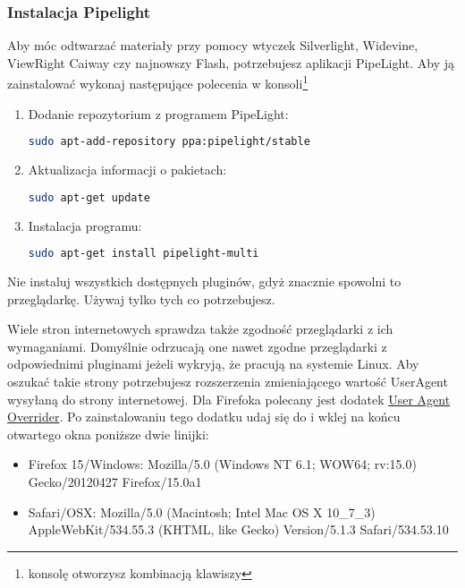 \subsubsection{Instalacja Pipelight}
Aby móc odtwarzać materiały przy pomocy wtyczek Silverlight, Widevine, ViewRight Caiway czy najnowszy Flash, potrzebujesz aplikacji PipeLight. Aby ją zainstalować wykonaj następujące polecenia w konsoli\footnote{konsolę otworzysz kombinacją klawiszy }
\begin{enumerate}
\item Dodanie repozytorium z programem PipeLight:
\begin{lstlisting}[language=bash]
sudo apt-add-repository ppa:pipelight/stable
\end{lstlisting}
\item Aktualizacja informacji o pakietach:
\begin{lstlisting}[language=bash]
sudo apt-get update
\end{lstlisting}
\item Instalacja programu:
\begin{lstlisting}[language=bash]
sudo apt-get install pipelight-multi
\end{lstlisting}
\end{enumerate}

\noindent Nie instaluj wszystkich dostępnych pluginów, gdyż znacznie spowolni to przeglądarkę. Używaj tylko tych co potrzebujesz.

Wiele stron internetowych sprawdza także zgodność przeglądarki z ich wymaganiami. Domyślnie odrzucają one nawet zgodne przeglądarki z odpowiednimi pluginami jeżeli wykryją, że pracują na systemie Linux. Aby oszukać takie strony potrzebujesz rozszerzenia zmieniającego wartość \textcolor{ubuntu_orange}{UserAgent} wysyłaną do strony internetowej. Dla Firefoka polecany jest dodatek \href{https://addons.mozilla.org/pl-PL/firefox/addon/user-agent-overrider/}{User Agent Overrider}. Po zainstalowaniu tego dodatku udaj się do  i wklej na końcu otwartego okna poniższe dwie linijki:
\begin{itemize}
\item Firefox 15/Windows: Mozilla/5.0 (Windows NT 6.1; WOW64; rv:15.0) Gecko/20120427 Firefox/15.0a1
\item Safari/OSX: Mozilla/5.0 (Macintosh; Intel Mac OS X 10\_7\_3) AppleWebKit/534.55.3 (KHTML, like Gecko) Version/5.1.3 Safari/534.53.10
\end{itemize}

